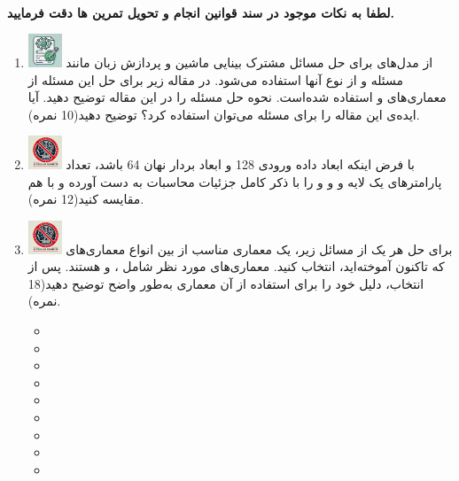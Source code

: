 \documentclass[12pt]{article}
\begin{document}
\fontsize{12pt}{14pt}\selectfont



\\
{\fontsize{14}{22}\selectfont \textbf{لطفا به نکات موجود در سند قوانین انجام و تحویل تمرین ها دقت فرمایید. }}

\begin{enumerate}

    \section*{سوالات تئوری}
    \item \includegraphics[width=1cm]{figs/Allowed_with_contributino.jpg}
     از مدل‌های  برای حل مسائل مشترک بینایی ماشین و پردازش زبان مانند مسئله  و از نوع  آنها استفاده می‌شود. در مقاله زیر برای حل این مسئله از معماری‌های  و  استفاده شده‌است. نحوه حل مسئله را در این مقاله توضیح دهید. آیا ایده‌ی این مقاله را برای مسئله  می‌توان استفاده کرد؟ توضیح دهید(10 نمره).\\

    \item \includegraphics[width=1cm]{figs/Forbidden_AI.jpg}
    با فرض اینکه ابعاد داده ورودی 128 و ابعاد بردار نهان 64 باشد، تعداد پارامترهای یک لایه  و  و  و  را با ذکر کامل جزئیات محاسبات به دست آورده و با هم مقایسه کنید(12 نمره).
    
    \item \includegraphics[width=1cm]{figs/Forbidden_AI.jpg}
    برای حل هر یک از مسائل زیر، یک معماری مناسب از بین انواع معماری‌های  که تاکنون آموخته‌اید، انتخاب کنید. معماری‌های مورد نظر شامل ،  و  هستند. پس از انتخاب، دلیل خود را برای استفاده از آن معماری به‌طور واضح توضیح دهید(18 نمره).
    \begin{itemize}
        \item {}
        \item {}
        \item {}
        \item {}
        \item {}
        \item {}
        \item {}
        \item {}
        \item {}


\end{itemize}
\end{enumerate}
\end{document}
